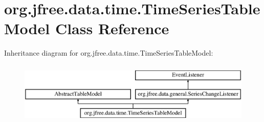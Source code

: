 \hypertarget{classorg_1_1jfree_1_1data_1_1time_1_1_time_series_table_model}{}\section{org.\+jfree.\+data.\+time.\+Time\+Series\+Table\+Model Class Reference}
\label{classorg_1_1jfree_1_1data_1_1time_1_1_time_series_table_model}
Inheritance diagram for org.\+jfree.\+data.\+time.\+Time\+Series\+Table\+Model\+:\begin{figure}[H]
\begin{center}
\leavevmode
\includegraphics[height=3.000000cm]{classorg_1_1jfree_1_1data_1_1time_1_1_time_series_table_model}
\end{center}
\end{figure}
